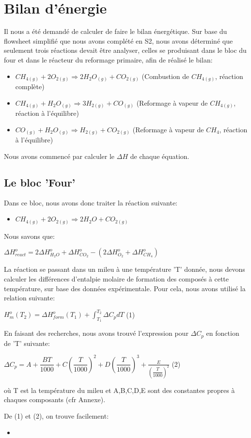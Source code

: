 \documentclass[11pt,a4paper]{report}
\author{Groupe 1246}
\begin{document}
\section*{Bilan d'énergie}
Il nous a été demandé de calculer de faire le bilan énergétique. Sur base du flowsheet simplifié que nous avons complété en S2, nous avons déterminé que seulement trois réactions devait être analyser, celles se produisant dans le bloc du four et dans le réacteur du reformage primaire, afin de réalisé le bilan:
\begin{itemize}
\item{$CH_{4(g)} + 2O_{2(g)} \Rightarrow 2H_{2}O_{(g)} + CO_{2(g)}$ (Combustion de $CH_{4(g)}$, réaction complète)}
\item{$CH_{4(g)} + H_{2}O_{(g)} \Rightarrow 3H_{2(g)} + CO_{(g)}$ (Reformage à vapeur de $CH_{4(g)}$, réaction à l'équilibre)}
\item{$CO_{(g)} + H_{2}O_{(g)} \Rightarrow H_{2(g)} + CO_{2(g)}$ (Reformage à vapeur de $CH_{4}$, réaction à l'équilibre)}
\end{itemize}

Nous avons commencé par calculer le $\Delta H$ de chaque équation.
\subsection*{Le bloc 'Four'}
Dans ce bloc, nous avons donc traiter la réaction suivante:
\begin{itemize}
\item{$CH_{4(g)} + 2O_{2(g)} \Rightarrow 2H_{2}O + CO_{2(g)}$}
\end{itemize}
Nous savons que:

$\Delta H^o_{react}=2\Delta H^o_{H_2O} + \Delta H^o_{CO_2} - (2\Delta H^o_{O_2} + \Delta H^o_{CH_4})$

La réaction se passant dans un mileu à une température 'T' donnée, nous devons calculer les différences d'entalpie molaire de formation des composés à cette température, sur base des données expérimentale. Pour cela, nous avons utilisé la relation suivante:

$H^o_m(T_2)=\Delta H^o_{form}(T_1)+\int_{T_1}^{T_2} \Delta C_pdT$   (1)

En faisant des recherches, nous avons trouvé l'expression pour $\Delta C_p$ en fonction de 'T' suivante:

$\Delta C_p=A+\dfrac{BT}{1000}+C(\dfrac{T}{1000})^2+D(\dfrac{T}{1000})^3+\frac{E}{(\dfrac{T}{1000})^2}$        (2)

où T est la température du mileu et A,B,C,D,E sont des constantes propres à chaques composants (cfr Annexe).

De (1) et (2), on trouve facilement:
\begin{itemize}
\item{}
\end{itemize}
\end{document}
